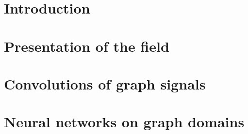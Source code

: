 \documentclass[12pt]{book}
\begin{document}

%
%


\newline



 \dominitoc
 \tableofcontents
 \adjustmtc

%
%

\chapter*{Introduction}\label{chp:int}
\todo{}

%
%

  \chapter{Presentation of the field}\label{chap:1}
  \minitoc\newpage
  \newpage

  \newpage
  \newpage
  \newpage

%
%

\setcounter{chapter}{1}
\chapter{Convolutions of graph signals}\label{chap:2}
  \minitoc\newpage
  \newpage

\newpage
\newpage
\newpage
\newpage
\newpage

%
%
 \setcounter{chapter}{2}
 \chapter{Neural networks on graph domains}\label{chap:3}
  \minitoc\newpage
  \newpage
\end{document}
